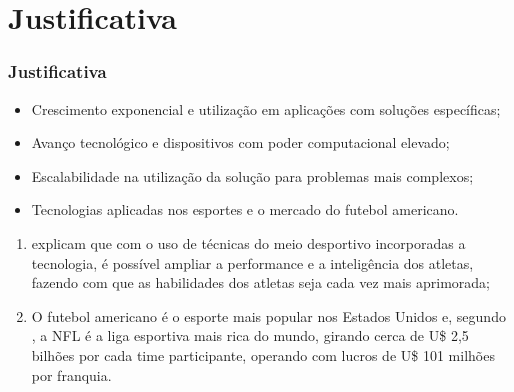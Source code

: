 \section{Justificativa}
\begin{frame}
\frametitle{Justificativa}

\begin{itemize}
\item Crescimento exponencial e utilização em aplicações com soluções específicas;

\item Avanço tecnológico e dispositivos com poder computacional elevado;
   
\item Escalabilidade na utilização da solução para problemas mais complexos;

\item Tecnologias aplicadas nos esportes e o mercado do futebol americano.

\end{itemize}

\begin{enumerate}

\item {} explicam que com o uso de técnicas do meio desportivo incorporadas
    a tecnologia, é possível ampliar a performance e a inteligência dos atletas, fazendo com
    que as habilidades dos atletas seja cada vez mais aprimorada;
    
    \item O futebol americano é o esporte mais popular nos Estados Unidos e, segundo , a NFL é a liga esportiva mais rica do mundo, girando cerca de U\$ 2,5 bilhões por cada time participante, operando com lucros de U\$ 101 milhões por franquia.
\end{enumerate}

\end{frame}